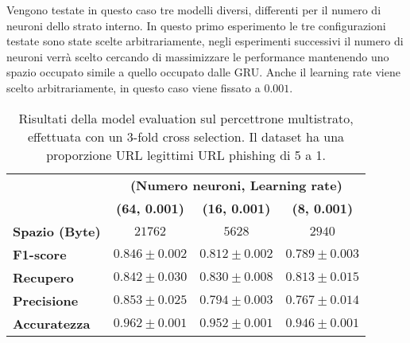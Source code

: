 \documentclass[../../main.tex]{subfiles}
\begin{document}
    Vengono testate in questo caso tre modelli diversi, differenti per il numero di neuroni dello strato interno. In questo primo esperimento le tre configurazioni testate sono state scelte arbitrariamente, negli esperimenti successivi il numero di neuroni verrà scelto cercando di massimizzare le performance mantenendo uno spazio occupato simile a quello occupato dalle GRU. Anche il learning rate viene scelto arbitrariamente, in questo caso viene fissato a $0.001$.

    \begin{table}[H]
        \centering
        \begin{tabular}{lccc}
            \toprule
            {} &                      \multicolumn{3}{c}{\textbf{(Numero neuroni, Learning rate)}}\\
            {} &                      \textbf{(64, 0.001)} & \textbf{(16, 0.001)} & \textbf{(8, 0.001)} \\
            \midrule
            \textbf{Spazio (Byte)}  &      $21762$ & $5628$ & $2940$\\
            \midrule
            \textbf{F1-score }      &      $0.846 \pm 0.002$ & $0.812 \pm 0.002$ & $0.789 \pm 0.003$\\
            \textbf{Recupero   }    &      $0.842 \pm 0.030$ & $0.830 \pm 0.008$ & $0.813 \pm 0.015$\\
            \textbf{Precisione}     &      $0.853 \pm 0.025$ & $0.794 \pm 0.003$ & $0.767 \pm 0.014$\\
            \textbf{Accuratezza}    &      $0.962 \pm 0.001$ & $0.952 \pm 0.001$ & $0.946 \pm 0.001$\\
            \bottomrule            
        \end{tabular}
        \caption{Risultati della model evaluation sul percettrone multistrato, effettuata con un 3-fold cross selection. Il dataset ha una proporzione URL legittimi URL phishing di 5 a 1.}
        \label{tab:FFNNModelSelection}
    \end{table}
\end{document}
